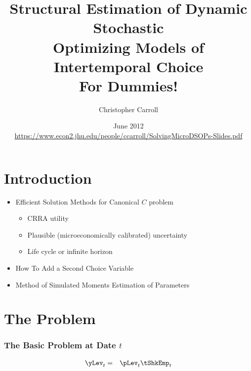 \documentclass{beamer}
\begin{document}

\title[SolvingMicroDSOPs]{\textbf{Structural Estimation of Dynamic Stochastic\\ Optimizing Models of Intertemporal Choice \\ \LARGE{For Dummies!}}}
\author[Carroll]{Christopher Carroll}

\date{June 2012 \\ {\tiny \url{https://www.econ2.jhu.edu/people/ccarroll/SolvingMicroDSOPs-Slides.pdf}}
}

\begin{frame}[plain]
  \titlepage
\end{frame}

\section{Introduction}

\begin{frame}
\begin{itemize}
\item Efficient Solution Methods for Canonical $C$ problem
\begin{itemize}
\item CRRA utility
\item Plausible (microeconomically calibrated) uncertainty
\item Life cycle or infinite horizon
\end{itemize}
\item How To Add a Second Choice Variable
\item Method of Simulated Moments Estimation of Parameters
\end{itemize}
\end{frame}

\section{The Problem}

\begin{frame}[label=MaxProb]
\frametitle{\large\textbf{The Basic Problem at Date $t$}}


\begin{eqnarray}
{\yLev}_{t} & = & {\pLev}_{t}\tShkEmp_{t}
\end{eqnarray}

\end{frame}
\end{document}
